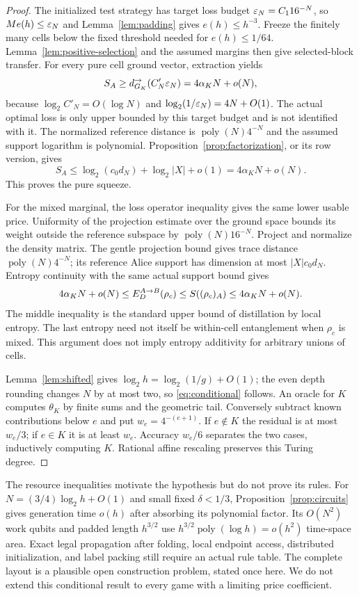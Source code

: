 \begin{proof}
The initialized test strategy has target loss budget
$\varepsilon_N=C_1 16^{-N}$, so $Me(h)\leq\varepsilon_N$ and
Lemma~\ref{lem:padding} gives $e(h)\leq h^{-3}$.
Freeze the finitely many cells below the fixed threshold needed for
$e(h)\leq1/64$. Lemma~\ref{lem:positive-selection} and the assumed
margins then give selected-block transfer.
For every pure cell ground vector, extraction yields
\[
 S_A\geq d_{G_K}^{\to}(C'_N\varepsilon_N)=4\alpha_KN+o(N),
\]
because $\log_2C'_N=O(\log N)$ and
$\log_2(1/\varepsilon_N)=4N+O(1)$. The actual optimal loss is only upper
bounded by this target budget and is not identified with it.
The normalized reference distance is
$\operatorname{poly}(N)4^{-N}$ and the assumed support logarithm
is polynomial. Proposition~\ref{prop:factorization}, or its row
version, gives
\[
 S_A\leq\log_2(c_0d_N)+\log_2|X|+o(1)=4\alpha_KN+o(N).
\]
This proves the pure squeeze.

For the mixed marginal, the loss operator inequality gives the same
lower usable price. Uniformity of the projection estimate over the
ground space bounds its weight outside the reference subspace by
$\operatorname{poly}(N)16^{-N}$. Project and normalize the density
matrix. The gentle projection bound gives trace distance
$\operatorname{poly}(N)4^{-N}$; its reference Alice support has
dimension at most $|X|c_0d_N$. Entropy continuity with the same actual
support bound gives
\[
 4\alpha_KN+o(N)\leq E_D^{A\to B}(\rho_c)\leq S((\rho_c)_A)
                         \leq4\alpha_KN+o(N).
\]
The middle inequality is the standard upper bound of distillation by
local entropy. The last entropy need not itself be within-cell
entanglement when $\rho_c$ is mixed. This argument does not imply
entropy additivity for arbitrary unions of cells.

Lemma~\ref{lem:shifted} gives
$\log_2h=\log_2(1/g)+O(1)$; the even depth rounding changes $N$
by at most two, so \eqref{eq:conditional} follows. An oracle for
$K$ computes $\theta_K$ by finite sums and the geometric tail.
Conversely subtract known contributions below $e$ and put
$w_e=4^{-(e+1)}$. If $e\notin K$ the residual is at most $w_e/3$;
if $e\in K$ it is at least $w_e$. Accuracy $w_e/6$ separates the
two cases, inductively computing $K$. Rational affine rescaling
preserves this Turing degree.
\end{proof}

The resource inequalities motivate the hypothesis but do not prove its
rules. For $N=(3/4)\log_2h+O(1)$ and small fixed $\delta<1/3$,
Proposition~\ref{prop:circuits} gives generation time $o(h)$ after
absorbing its polynomial factor. Its $O(N^2)$ work qubits and padded
length $h^{3/2}$ use $h^{3/2}\operatorname{poly}(\log h)=o(h^2)$
time-space area. Exact legal propagation after folding, local endpoint
access, distributed initialization, and label packing still require
an actual rule table. The complete layout is a plausible open
construction problem, stated once here. We do not extend this
conditional result to every game with a limiting price coefficient.
